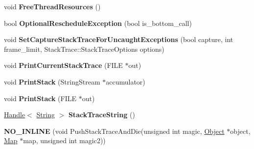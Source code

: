 \begin{DoxyCompactItemize}
\item 
\hypertarget{classv8_1_1internal_1_1_isolate_a858345eefd66c1d3cc41334b6df8dae9}{}void {\bfseries Free\+Thread\+Resources} ()\label{classv8_1_1internal_1_1_isolate_a858345eefd66c1d3cc41334b6df8dae9}

\item 
\hypertarget{classv8_1_1internal_1_1_isolate_af1ebc122bf08aa361a5d73c0ea1b441d}{}bool {\bfseries Optional\+Reschedule\+Exception} (bool is\+\_\+bottom\+\_\+call)\label{classv8_1_1internal_1_1_isolate_af1ebc122bf08aa361a5d73c0ea1b441d}

\item 
\hypertarget{classv8_1_1internal_1_1_isolate_a78f604bee42e9628f7e2c0ff1e8601e8}{}void {\bfseries Set\+Capture\+Stack\+Trace\+For\+Uncaught\+Exceptions} (bool capture, int frame\+\_\+limit, Stack\+Trace\+::\+Stack\+Trace\+Options options)\label{classv8_1_1internal_1_1_isolate_a78f604bee42e9628f7e2c0ff1e8601e8}

\item 
\hypertarget{classv8_1_1internal_1_1_isolate_a2e087a2fe0e6578a42f02650507db595}{}void {\bfseries Print\+Current\+Stack\+Trace} (F\+I\+L\+E $\ast$out)\label{classv8_1_1internal_1_1_isolate_a2e087a2fe0e6578a42f02650507db595}

\item 
\hypertarget{classv8_1_1internal_1_1_isolate_a59c8ff304153ad2d58149359bdf07714}{}void {\bfseries Print\+Stack} (String\+Stream $\ast$accumulator)\label{classv8_1_1internal_1_1_isolate_a59c8ff304153ad2d58149359bdf07714}

\item 
\hypertarget{classv8_1_1internal_1_1_isolate_ae4dd8178bb11bc09b8c127853117d07c}{}void {\bfseries Print\+Stack} (F\+I\+L\+E $\ast$out)\label{classv8_1_1internal_1_1_isolate_ae4dd8178bb11bc09b8c127853117d07c}

\item 
\hypertarget{classv8_1_1internal_1_1_isolate_a6dcfa7a6999e4785cba91f25d2df7433}{}\hyperlink{classv8_1_1internal_1_1_handle}{Handle}$<$ \hyperlink{classv8_1_1internal_1_1_string}{String} $>$ {\bfseries Stack\+Trace\+String} ()\label{classv8_1_1internal_1_1_isolate_a6dcfa7a6999e4785cba91f25d2df7433}

\item 
\hypertarget{classv8_1_1internal_1_1_isolate_a0fa5a553bb3c38ffc7c824c9d5bd24c4}{}{\bfseries N\+O\+\_\+\+I\+N\+L\+I\+N\+E} (void Push\+Stack\+Trace\+And\+Die(unsigned int magic, \hyperlink{classv8_1_1internal_1_1_object}{Object} $\ast$object, \hyperlink{classv8_1_1internal_1_1_map}{Map} $\ast$map, unsigned int magic2))\label{classv8_1_1internal_1_1_isolate_a0fa5a553bb3c38ffc7c824c9d5bd24c4}


\end{DoxyCompactItemize}

